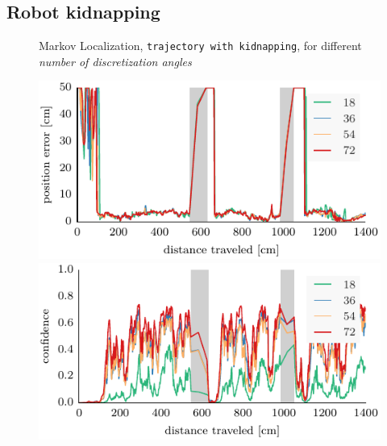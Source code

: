 \documentclass[letterpaper, 10pt, conference]{ieeeconf}
\begin{document}
\subsection{Robot kidnapping}

\begin{figure}

\begin{center}
Markov Localization, \texttt{trajectory with kidnapping}, for different \emph{number of discretization angles}
\end{center}
\includegraphics{ml-whole_random_long-xy}
\includegraphics{ml-whole_random_long-conf}

\vspace{.3em}


\end{figure}
\end{document}
